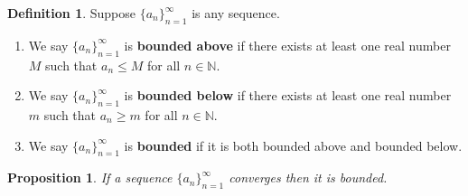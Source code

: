 \documentclass[12pt]{amsart}
\newcommand{\N}{\mathbb{N}}
\numberwithin{equation}{section}
\theoremstyle{plain} %
\newtheorem{prop}[equation]{Proposition}
\theoremstyle{definition}
\newtheorem{defn}[equation]{Definition}
\theoremstyle{remark}
\newtheorem{rem}[equation]{Remark}
\begin{document}
\begin{defn} Suppose $\{a_n\}_{n=1}^\infty$ is any sequence. 

\begin{enumerate}

\item 
We say $\{a_n\}_{n=1}^\infty$ is \textbf{bounded above} if there  exists at least one real number $M$ such that $a_n \leq M$ for all $n   \in
\N$.
\item We say $\{a_n\}_{n=1}^\infty$ is \textbf{bounded below} if there  exists at least one real number $m$ such that $a_n \geq m$ for all $n   \in
\N$.
\item We say 
$\{a_n\}_{n=1}^\infty$ is  \textbf{bounded} if it is both bounded above and bounded below.


\end{enumerate}
\end{defn}


%



\begin{prop} \label{prop21}
	If a sequence $\{a_n\}_{n=1}^\infty$ converges then it is bounded.
\end{prop}
\end{document}
